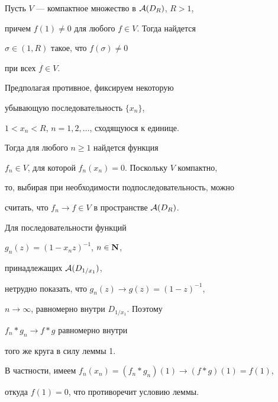 \begin{lem}


Пусть $V$ --- компактное множество в ${\cal A}(D_R)$, $R>1$, 


причем $f(1) \neq 0$ для любого $f\in V$. Тогда найдется 


$\sigma \in (1,R)$ такое, что $f(\sigma) \neq 0 $ 


при всех $f \in V$.


\end{lem}





\begin{pf}


Предполагая противное, фиксируем некоторую


убывающую последовательность $\{ x_n \}$, 


$1 < x_n < R$, $n=1,2,\dotsc$, сходящуюся к единице. 


Тогда для любого $n \ge 1$ найдется функция 


$f_n \in V$, для которой $f_n (x_n )=0$. Поскольку $V$ компактно, 


то, выбирая при необходимости подпоследовательность, можно 


считать, что $f_n \to f \in V$ в пространстве ${\cal A}(D_R)$. 


Для последовательности функций 


$g_n (z)= (1-x_n z)^{-1}$, $n \in \bold N$, 


принадлежащих ${\cal A}(D_{1/x_1})$,


нетрудно показать, что $g_n (z) \rightarrow g(z)=(1-z)^{-1}$, 


$n \to \infty$, равномерно внутри $D_{1/x_1}$. Поэтому


$f_n *g_n \rightarrow f*g$ равномерно внутри 


того же круга в силу леммы 1. 


В частности, имеем $f_n (x_n )= (f_n *g_n )(1) \to (f*g)(1)= f(1)$,


откуда $f(1)=0$, что противоречит условию леммы.


\end{pf}





